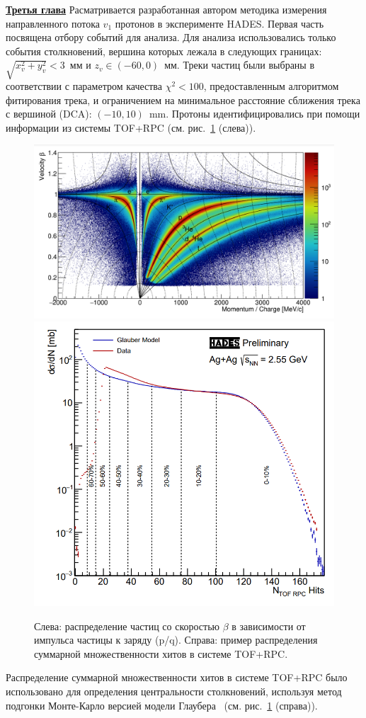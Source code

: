 \underline{\textbf{Третья глава}} Расматривается разработанная автором методика измерения направленного потока $v_1$ протонов в эксперименте HADES. 
Первая часть посвящена отбору событий для анализа. 
Для анализа использовались только события столкновений, вершина которых лежала в следующих границах: $\sqrt{x_v^2+y_v^2}<3$~мм и $z_v \in (-60, 0)$~мм.
Треки частиц были выбраны в соответствии с параметром качества $\chi^2<100$, предоставленным алгоритмом фитирования трека, и ограничением на минимальное расстояние сближения трека с вершиной (DCA): $(-10,10)$~mm. 
Протоны идентифицировались при помощи информации из системы  TOF+RPC (см. рис.~\ref{fig:hades_pid} (слева)).

\begin{figure}[h]
\begin{center}
  \includegraphics[width=0.54\linewidth]{images/hades_pid_plot.png}
  \includegraphics[width=0.33\linewidth]{images/hades_mult.png}
  \caption{ Слева: распределение частиц со скоростью $\beta$  в зависимости от  импульса частицы к заряду
    (p/q). Справа: пример распределения суммарной множественности хитов в системе TOF+RPC.}
\label{fig:hades_pid}
\end{center}
\end{figure}

Распределение суммарной множественности хитов в системе TOF+RPC было использовано для определения центральности столкновений, используя метод подгонки Монте-Карло версией модели Глаубера ~\cite{HADES:2017def}(см. рис.~\ref{fig:hades_pid} (справа)).

